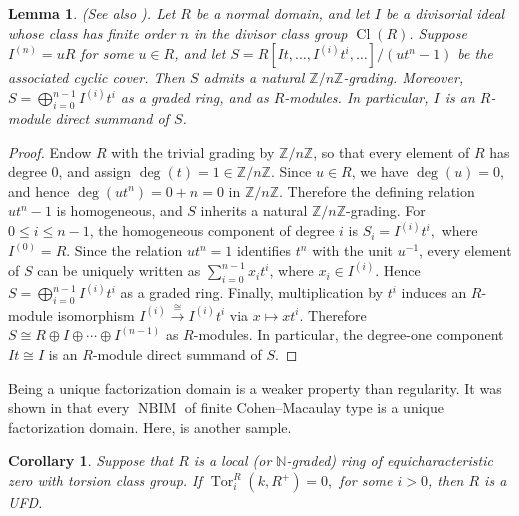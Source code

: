 \documentclass[12pt,reqno]{amsart}
\newtheorem{corollary}[theorem]{Corollary}
\newtheorem{lemma}[theorem]{Lemma}
\theoremstyle{definition}
\theoremstyle{remark}
\theoremstyle{cited}
\theoremstyle{remark}
\theoremstyle{citeddef}
\DeclareMathOperator{\Tor}{Tor}
\DeclareMathOperator{\NBIM}{NBIM}
\newcommand{\Cl}{\operatorname{Cl}}
\begin{document}
	
	\begin{lemma}(See also \cite[Proposition 4.2]{Sing}).
		Let $R$ be a normal domain, and let $I$ be a divisorial ideal whose class has
		finite order $n$ in the divisor class group $\Cl(R)$. Suppose
		\(
		I^{(n)}=uR
		\)
		for some $u\in R$, and let
		\(
		S=R[It,\ldots,I^{(i)}t^i,\ldots]/(ut^n-1)
		\)
		be the associated cyclic cover. Then $S$ admits a natural
		$\mathbb{Z}/n\mathbb{Z}$-grading. Moreover,
		\(
		S=\bigoplus_{i=0}^{n-1} I^{(i)}t^i
		\)
		as a graded ring, and
		as $R$-modules. In particular, $I$ is an $R$-module direct summand of $S$.
	\end{lemma}
	
	\begin{proof}
		Endow $R$ with the trivial grading by $\mathbb{Z}/n\mathbb{Z}$, so that every
		element of $R$ has degree $0$, and assign
		\(
		\deg(t)=1\in\mathbb{Z}/n\mathbb{Z}.
		\)
		Since $u\in R$, we have $\deg(u)=0$, and hence
		\(
		\deg(ut^n)=0+n=0
		\)
		in $\mathbb{Z}/n\mathbb{Z}$. Therefore the defining relation $ut^n-1$ is
		homogeneous, and $S$ inherits a natural $\mathbb{Z}/n\mathbb{Z}$-grading.
		For $0\le i\le n-1$, the homogeneous component of degree $i$ is
		\(
		S_i=I^{(i)}t^i,
		\)
		where $I^{(0)}=R$. Since the relation $ut^n=1$ identifies $t^n$ with the unit
		$u^{-1}$, every element of $S$ can be uniquely written as
		\(
		\sum_{i=0}^{n-1}x_it^i\), where \( x_i\in I^{(i)}.
		\)
		Hence
		\(
		S=\bigoplus_{i=0}^{n-1}I^{(i)}t^i
		\)
		as a graded ring.
		Finally, multiplication by $t^i$ induces an $R$-module isomorphism
		\(
		I^{(i)}\xrightarrow{\ \cong\ } I^{(i)}t^i\) via
		\(x\mapsto xt^i.
		\)
		Therefore
		\(
		S\cong R\oplus I\oplus\cdots\oplus I^{(n-1)}
		\)
		as $R$-modules. In particular, the degree-one component
		\(
		It\cong I
		\)
		is an $R$-module direct summand of $S$.
	\end{proof}
	
	
	
	
	Being a unique factorization domain is a weaker property than regularity. It was shown in \cite[Proposition~5.6]{Elham} that every  $\NBIM$  of finite Cohen--Macaulay type is a unique factorization domain.
	Here, is another sample.
	
	
	
	
	
	
	
	\begin{corollary}
		\label{tcl}
		Suppose that \( R \) is a local (or \( \mathbb{N} \)-graded) ring of equicharacteristic zero with torsion class group. If
		\(
		\Tor_i^R(k,R^+)=0,
		\) for some $i>0$,
		then \( R \) is a UFD.
		
	\end{corollary}
	
\end{document}
